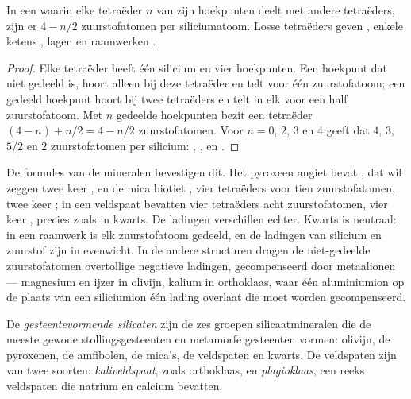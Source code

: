 
\begin{proposition}\label{prop:g11:minerals:sharing}
In een  waarin elke tetraëder $n$ van zijn hoekpunten deelt met andere
tetraëders, zijn er $4 - n/2$ zuurstofatomen per siliciumatoom. Losse
tetraëders geven , enkele ketens , lagen  en
raamwerken .
\end{proposition}

\begin{proof}
Elke tetraëder heeft één silicium en vier hoekpunten. Een hoekpunt dat niet
gedeeld is, hoort alleen bij deze tetraëder en telt voor één zuurstofatoom; een gedeeld
hoekpunt hoort bij twee tetraëders en telt in elk voor een half zuurstofatoom. Met
$n$ gedeelde hoekpunten bezit een tetraëder $(4 - n) + n/2 = 4 - n/2$ zuurstofatomen.
Voor $n = 0$, $2$, $3$ en $4$ geeft dat $4$, $3$, $5/2$ en $2$ zuurstofatomen
per silicium: , ,  en .
\end{proof}

De formules van de mineralen bevestigen dit. Het pyroxeen augiet bevat
, dat wil zeggen twee keer , en de mica biotiet ,
vier tetraëders voor tien zuurstofatomen, twee keer ; in een veldspaat bevatten vier
tetraëders acht zuurstofatomen, vier keer , precies zoals in kwarts.
De ladingen verschillen echter. Kwarts is neutraal: in een raamwerk is elk zuurstofatoom
gedeeld, en de ladingen van silicium en zuurstof zijn in evenwicht. In de andere
structuren dragen de niet-gedeelde zuurstofatomen overtollige negatieve ladingen, gecompenseerd door
metaalionen --- magnesium en ijzer in olivijn, kalium in orthoklaas, waar
één aluminiumion  op de plaats van een siliciumion 
één lading overlaat die moet worden gecompenseerd.

\begin{definition}\label{def:g11:minerals:rock-forming}
De \emph{gesteentevormende silicaten} zijn de zes
groepen silicaatmineralen die de meeste gewone stollingsgesteenten en
metamorfe gesteenten vormen: olivijn, de pyroxenen, de amfibolen, de mica's, de
veldspaten en kwarts. De veldspaten zijn van twee soorten: \emph{kaliveldspaat},
zoals orthoklaas, en \emph{plagioklaas}, een reeks
veldspaten die natrium en calcium bevatten.
\end{definition}

